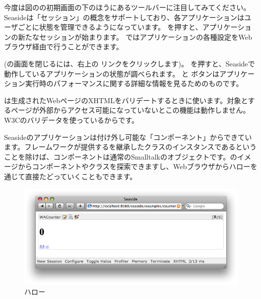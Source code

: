 \documentclass[a4paper,10pt,twoside]{book}
\begin{document}
今度は図のの初期画面の下のほうにあるツールバーに注目してみてください。
Seasideは「セッション」の概念をサポートしており、各アプリケーションはユーザごとに状態を管理できるようになっています。
 を押すと、アプリケーションの新たなセッションが始まります。
 ではアプリケーションの各種設定をWebブラウザ経由で行うことができます。

(の画面を閉じるには、右上の  リンクをクリックします)。
 を押すと、Seasideで動作しているアプリケーションの状態が調べられます。
 と  ボタンはアプリケーション実行時のパフォーマンスに関する詳細な情報を見るためのものです。

 は生成されたWebページのXHTMLをバリデートするときに使います。対象とするページが外部からアクセス可能になっていないとこの機能は動作しません。W3Cのバリデータを使っているからです。

Seasideのアプリケーションは付け外し可能な「コンポーネント」からできています。フレームワークが提供するを継承したクラスのインスタンスであるということを除けば、コンポーネントは通常のSmalltalkのオブジェクトです。\pharo のイメージからコンポーネントやクラスを探索できますし、Webブラウザからハローを通じて直接たどっていくこともできます。

\begin{figure}[ht]
\begin{center}
\includegraphics[width=\textwidth]{counterHalos}
\caption{ハロー}
\end{center}
\end{figure}

\end{document}

